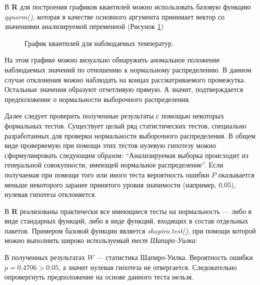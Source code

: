 В \textbf{R} для построения графиков квантилей можно использовать базовую функцию \textit{qqnorm()}, которая в качестве основного аргумента принимает вектор со значениями анализируемой переменной (Рисунок \ref{img:qqnorm})
\begin{figure}[ht]
\caption{График квантилей для наблюдаемых температур.}
\label{img:qqnorm}
\end{figure}
На этом графике можно визуально обнаружить аномальное положение наблюдаемых значений по отношению к нормальному распределению. В данном случае отклонения можно наблюдать на концах рассматриваемого промежутка. Остальные значения образуют отчетливую прямую. А значит, подтверждается предположение о нормальности выборочного распределения.

Далее следует проверить полученные результаты с помощью некоторых формальных тестов. Существует целый ряд статистических тестов, специально разработанных для проверки нормальности выборочного распределения. В общем виде проверяемую при помощи этих тестов нулевую гипотезу можно сформулиировать следующим образом: ``Анализируемая выборка происходит из генеральной совокупности, имеющей нормальное распределение''. Если получаемая при помощи того или иного теста вероятность ошибки $P$ оказывается меньше некоторого заранее принятого уровня значимости (например, $0.05$), нулевая гипотеза отклоняется.

В \textbf{R} реализованы практически все имеющиеся тесты на нормальность --- либо в виде стандарных функций, либо в виде функций, входящих в состав отдельных пакетов. Примером базовой функции является \textit{shapiro.test()}, при помощи которой можно выполнить широко используемый \textit{тест Шапиро-Уилка}:

В полученных результатах $W$ --- статистика Шапиро-Уилка. Вероятность ошибки $p = 0.4706 > 0.05$, а значит нулевая гипотеза не отвергается. Следовательно опровергнуть предположение на основе данного теста нельзя.

